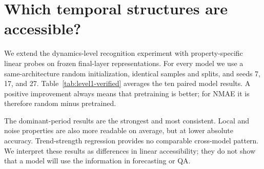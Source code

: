 \section{Which temporal structures are accessible?}
\label{sec:verified-diagnostics}

We extend the dynamics-level recognition experiment with property-specific
linear probes on frozen final-layer representations.  For every model we use a
same-architecture random initialization, identical samples and splits, and
seeds 7, 17, and 27.  Table~\ref{tab:level1-verified} averages the ten paired
model results.  A positive improvement always means that pretraining is better;
for NMAE it is therefore random minus pretrained.

\begin{table}[t]
\centering
\small
{}
\caption{Verified Level-1 final-layer diagnostics across ten models and three
seeds.  The last row is deliberately retained: its small mean and 6/10 sign
agreement show that accessibility gains are property-dependent.}
\label{tab:level1-verified}
\end{table}

The dominant-period results are the strongest and most consistent.  Local and
noise properties are also more readable on average, but at lower absolute
accuracy.  Trend-strength regression provides no comparable cross-model
pattern.  We interpret these results as differences in linear accessibility;
they do not show that a model will use the information in forecasting or QA.

